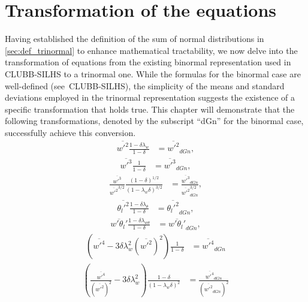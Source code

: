 \section{Transformation of the equations}\label{sec:transformationequations}

Having established the definition of the sum of normal distributions in \cref{sec:def_trinormal}
to enhance mathematical tractability,
we now delve into the transformation of equations from the existing binormal representation
used in CLUBB-SILHS\autocite{larson2022clubbsilhs} to a trinormal one.
While the formulas for the binormal case are well-defined (see~CLUBB-SILHS\autocite{larson2022clubbsilhs}),
the simplicity of the means and standard deviations employed in the trinormal representation suggests
the existence of a specific transformation that holds true.
This chapter will demonstrate that the following transformations,
denoted by the subscript \enquote{dGn} for the binormal case,
successfully achieve this conversion.
\begin{align}
    \overline{w'^2} \frac{1 - \delta\lambda_w}{1 - \delta}
    &= \overline{w'^2}_{dGn}, \label{eq:w_prime_2_transform}
\end{align}
\begin{align}
    \overline{w'^3} \frac{1}{1 - \delta}
    &= \overline{w'^3}_{dGn}, \label{eq:w_prime_3_transform}
\end{align}
\begin{align}
    \frac{\overline{w'^3}}{\overline{w'^2}^{3/2}} \frac{(1 - \delta)^{1/2}}{(1 - \lambda_w\delta)^{3/2}}
    &= \frac{\overline{w'^3}_{dGn}}{\overline{w'^2}_{dGn}^{3/2}}, \label{eq:w_prime_3_div_w_prime_2_transform}
\end{align}
\begin{align}
    \overline{\theta_l'^2} \frac{1 - \delta\lambda_\theta}{1 - \delta}
    &= \overline{\theta_l'^2}_{dGn}, \label{eq:theta_l_prime_transform}
\end{align}
\begin{align}
    \overline{w'\theta_l'} \frac{1 - \delta\lambda_{w\theta}}{1 - \delta}
    &= \overline{w'\theta_l'}_{dGn}, \label{eq:w_prime_theta_l_prime_transform}
\end{align}
\begin{align}
    \left(\overline{w'^4} - 3\delta\lambda_w^2 \left(\overline{w'^2}\right)^2\right) \frac{1}{1 - \delta}
    &= \overline{w'^4}_{dGn} \label{eq:w_prime_4_transform}
\end{align}
\begin{align}
    \left(\frac{\overline{w'^4}}{(\overline{w'^2})^2} - 3\delta\lambda_w^2 \right) \frac{1 - \delta}{(1 - \lambda_w\delta)^2}
    &= \frac{\overline{w'^4}_{dGn}}{(\overline{w'^2}_{dGn})^2} \label{eq:w_prime_4_div_w_prime_2_transform}
\end{align}
